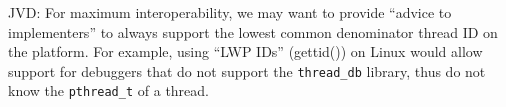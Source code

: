 \begin{notes}
JVD: For maximum interoperability, we may want to provide ``advice to
implementers'' to always support the lowest common denominator thread
ID on the platform. For example, using ``LWP IDs'' (gettid()) on Linux
would allow support for debuggers that do not support the
\verb|thread_db| library, thus do not know the \verb|pthread_t| of a
thread.
\end{notes}